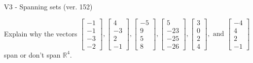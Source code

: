 \begin{exercise}
  \begin{exerciseTitle}V3 - Spanning sets (ver. 152)\end{exerciseTitle}
  \begin{exerciseStatement}
    Explain why the vectors \(\left[\begin{array}{r}
-1 \\
-1 \\
-3 \\
-2
\end{array}\right] , \left[\begin{array}{r}
4 \\
-3 \\
2 \\
-1
\end{array}\right] , \left[\begin{array}{r}
-5 \\
9 \\
5 \\
8
\end{array}\right] , \left[\begin{array}{r}
5 \\
-23 \\
-25 \\
-26
\end{array}\right] , \left[\begin{array}{r}
3 \\
0 \\
2 \\
4
\end{array}\right] , \text{ and } \left[\begin{array}{r}
-4 \\
4 \\
2 \\
-1
\end{array}\right]\) span or don't span \(\mathbb{R}^4\). 
	



\end{exerciseStatement}
\end{exercise}
